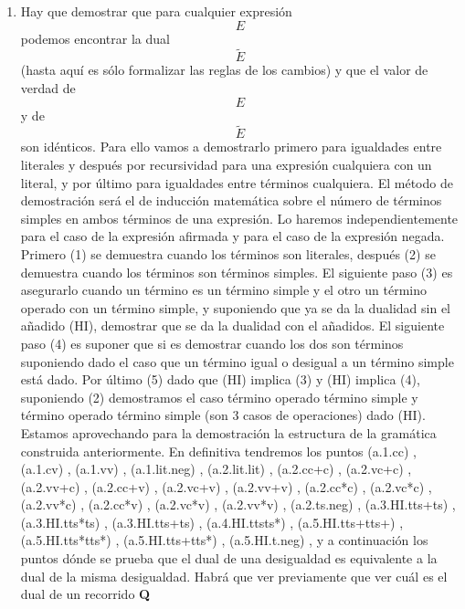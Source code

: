 \begin{enumerate}
\begin{enumerate}
\begin{enumerate}
\begin{enumerate}
        \begin{enumerate}
        \def\labelenumv{\arabic{enumv}.}
        \item
          Hay que demostrar que para cualquier expresión \[E\]pode\-mos
          encontrar la dual \[\widetilde{E}\](hasta aquí es sólo
          formalizar las reglas de los cambios) y que el valor de verdad
          de \[E\] y de \[\widetilde{E}\] son idénticos. Para ello vamos
          a demos\-trarlo primero para igualdades entre literales y
          des\-pués por recursividad para una expresión cualquiera con
          un literal, y por último para igualdades entre términos
          cualquiera. El método de demostración será el de induc\-ción
          matemática sobre el número de términos simples en ambos
          términos de una expresión. Lo haremos indepen\-dientemente
          para el caso de la expresión afirmada y para el caso de la
          expresión negada. Primero (1) se de\-muestra cuando los
          términos son literales, después (2) se demuestra cuando los
          términos son términos simples. El siguiente paso (3) es
          asegurarlo cuando un término es un término simple y el otro un
          término operado con un término simple, y suponiendo que ya se
          da la duali\-dad sin el añadido (HI), demostrar que se da la
          duali\-dad con el añadidos. El siguiente paso (4) es suponer
          que si es demostrar cuando los dos son términos supo\-niendo
          dado el caso que un término igual o desigual a un término
          simple está dado. Por último (5) dado que (HI) implica (3) y
          (HI) implica (4), suponiendo (2) de\-mostramos el caso término
          operado término simple y tér\-mino operado término simple (son
          3 casos de operacio\-nes) dado (HI). Estamos aprovechando para
          la demostra\-ción la estructura de la gramática construida
          anterior\-mente. En definitiva tendremos los puntos (a.1.cc) ,
          (a.1.cv) , (a.1.vv) , (a.1.lit.neg) , (a.2.lit.lit) ,
          (a.2.cc+c) , (a.2.vc+c) , (a.2.vv+c) , (a.2.cc+v) , (a.2.vc+v)
          , (a.2.vv+v) , (a.2.cc*c) , (a.2.vc*c) , (a.2.vv*c) ,
          (a.2.cc*v) , (a.2.vc*v) , (a.2.vv*v) , (a.2.ts.neg) ,
          (a.3.HI.tts+ts) , (a.3.HI.tts*ts) , (a.3.HI.tts+ts) ,
          (a.4.HI.ttsts*) , (a.5.HI.tts+tts+) , (a.5.HI.tts*tts*) ,
          (a.5.HI.tts+tts*) , (a.5.HI.t.neg) , y a continuación los
          puntos dónde se prueba que el dual de una desigual\-dad es
          equivalente a la dual de la misma desigualdad. Habrá que ver
          previamente que ver cuál es el dual de un recorrido \textbf{Q}

\end{enumerate}
\end{enumerate}
\end{enumerate}
\end{enumerate}
\end{enumerate}
